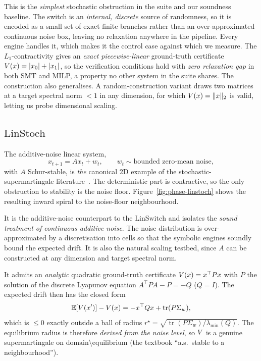 This is the \emph{simplest} stochastic obstruction in the suite and our
soundness baseline. The switch is an \emph{internal, discrete} source of
randomness, so it is encoded as a small set of exact finite branches rather than
an over-approximated continuous noise box, leaving no relaxation anywhere in the
pipeline. Every engine handles it, which makes it the control case against which
we measure. The $L_1$-contractivity gives an \emph{exact piecewise-linear}
ground-truth certificate $V(x) = |x_0| + |x_1|$, so the verification
conditions hold with \emph{zero relaxation gap} in both SMT and MILP, a property
no other system in the suite shares. The construction also generalises. A
random-construction variant draws two matrices at a target spectral norm $<1$ in
any dimension, for which $V(x) = \lVert x \rVert_2$ is valid, letting us
probe dimensional scaling.


\subsection{$\mathrm{LinStoch}$}
\label{sec:bench-linstoch}

The additive-noise linear system,
\[
  x_{t+1} = A x_t + w_t, \qquad w_t \sim \text{bounded zero-mean noise},
\]
with $A$ Schur-stable, is \emph{the} canonical 2D example of the
stochastic-supermartingale literature~\cite{lechner2022stability, badings2025logRASM}. The deterministic part is
contractive, so the only obstruction to stability is the noise floor.
Figure~\ref{fig:phase-linstoch} shows the resulting inward spiral to the
noise-floor neighbourhood.

It is the additive-noise counterpart to the $\mathrm{LinSwitch}$ and isolates the
\emph{sound treatment of continuous additive noise}. The noise distribution is
over-approximated by a discretisation into cells so that the symbolic engines
soundly bound the expected drift. It is also the natural scaling testbed, since
$A$ can be constructed at any dimension and target spectral norm.

It admits an \emph{analytic} quadratic ground-truth certificate $V(x) = x^\top P
x$ with $P$ the solution of the discrete Lyapunov equation $A^\top P A - P = -Q$
($Q = I$). The expected drift then has the closed form
\[
  \mathbb{E}[V(x')] - V(x) = -x^\top Q x + \operatorname{tr}(P\Sigma_w),
\]
which is $\le 0$ exactly outside a ball of radius
$r^\star = \sqrt{\operatorname{tr}(P\Sigma_w)/\lambda_{\min}(Q)}$. The
equilibrium radius is therefore \emph{derived from the noise level}, so $V$ is a
genuine supermartingale on $\text{domain}\setminus\text{equilibrium}$ (the
textbook ``a.s.\ stable to a neighbourhood'').


